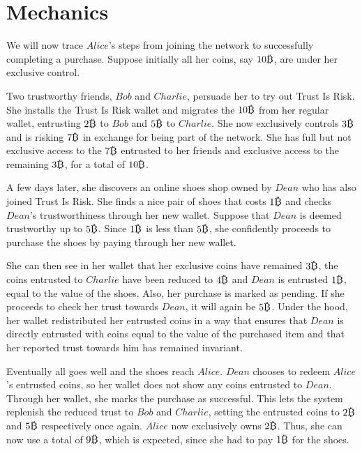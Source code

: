 \section{Mechanics}
  We will now trace $Alice$'s steps from joining the network to successfully completing a purchase. Suppose initially
  all her coins, say $10\bitcoin$, are under her exclusive control.

  Two trustworthy friends, $Bob$ and $Charlie$, persuade her to try out Trust Is Risk. She installs the Trust Is Risk
  wallet and migrates the $10\bitcoin$ from her regular wallet, entrusting $2\bitcoin$ to $Bob$ and $5\bitcoin$ to $Charlie$.
  She now exclusively controls $3\bitcoin$ and is risking $7\bitcoin$ in exchange for being part of the network. She has full
  but not exclusive access to the $7\bitcoin$ entrusted to her friends and exclusive access to the remaining $3\bitcoin$, for
  a total of $10\bitcoin$.

  A few days later, she discovers an online shoes shop owned by $Dean$ who has also joined Trust Is Risk. She finds a nice
  pair of shoes that costs $1\bitcoin$ and checks $Dean$'s trustworthiness through her new wallet. Suppose that $Dean$ is
  deemed trustworthy up to $5\bitcoin$. Since $1\bitcoin$ is less than $5\bitcoin$, she confidently proceeds to purchase the
  shoes by paying through her new wallet.

  She can then see in her wallet that her exclusive coins have remained $3\bitcoin$, the coins entrusted to $Charlie$ have
  been reduced to $4\bitcoin$ and $Dean$ is entrusted $1\bitcoin$, equal to the value of the shoes. Also, her purchase is
  marked as pending. If she proceeds to check her trust towards $Dean$, it will again be $5\bitcoin$. Under the hood, her
  wallet redistributed her entrusted coins in a way that ensures that $Dean$ is directly entrusted with coins equal to the
  value of the purchased item and that her reported trust towards him has remained invariant.

  Eventually all goes well and the shoes reach $Alice$. $Dean$ chooses to redeem $Alice$'s entrusted coins, so her wallet
  does not show any coins entrusted to $Dean$. Through her wallet, she marks the purchase as successful. This lets the system
  replenish the reduced trust to $Bob$ and $Charlie$, setting the entrusted coins to $2\bitcoin$ and $5\bitcoin$ respectively
  once again. $Alice$ now exclusively owns $2\bitcoin$. Thus, she can now use a total of $9\bitcoin$, which is expected,
  since she had to pay $1\bitcoin$ for the shoes.
